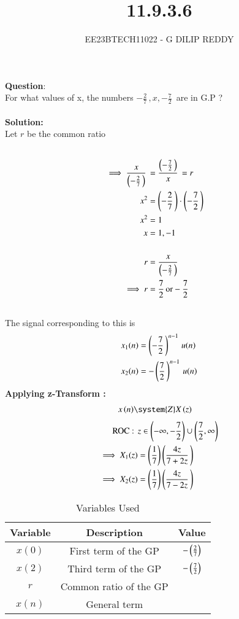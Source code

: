 \documentclass[journal,12pt,twocolumn]{IEEEtran}
\theoremstyle{remark}
\begin{document}

\vspace{3cm}

\title{11.9.3.6}
\author{EE23BTECH11022 - G DILIP REDDY}
\maketitle
\newpage

\bigskip

\renewcommand{\thefigure}{\theenumi}
\renewcommand{\thetable}{\theenumi}
\textbf{Question}:\\
For what values of x, the numbers $-\frac{2}{7}\,,x,-\frac{7}{2}\,$ are in G.P ?
\\\\
\textbf{Solution: }\\
Let $r$ be the common ratio
\begin{align}
\\\implies \frac{x}{\left(-\frac{2}{7}\,\right)}\,&= \frac{\left(-\frac{7}{2}\,\right)}{x}\,=r \\
x^2&=\left(-\frac{2}{7}\,\right)\cdot\left(-\frac{7}{2}\,\right)\\
x^2&=1\\
x&=1,-1\\\notag\\
r&=\frac{x}{\left(-\frac{2}{7}\,\right)}\\
\implies r&=\frac{7}{2}\,\text{or} -\frac{7}{2}\,\\\notag
\end{align}
The signal corresponding to this is 
\begin{align}
x_1(n)&=\left(-\frac{7}{2}\,\right)^{n-1}\,u(n)\,\\
x_2(n)&=-\left(\frac{7}{2}\,\right)^{n-1}\,u(n)
\end{align}
\textbf{Applying z-Transform :}
\begin{align}
	x \brak{n} & \system{Z} X \brak{z} \notag
\end{align}
\begin{align}
\text{ROC : }\,&z \in \left(-\infty,-\frac{7}{2}\right)\cup\left(\frac{7}{2},\infty\right)\notag\\
\implies X_1(z)&=\left(\frac{1}{7}\right)\left(\frac{4z}{7+2z}\,\right)\\
\implies X_2(z)&=\left(\frac{1}{7}\right)\left(\frac{4z}{7-2z}\,\right)
\end{align}
\begin{table}[h]
    \centering
    \renewcommand\thetable{1}
    \begin{tabular}[12.1pt]{ |c| c| c|}
    \hline
    \textbf{Variable} & \textbf{Description} &\textbf{Value}\\ 
    \hline
    $x(0)$ & First term of the GP &$-\left(\frac{2}{7}\right)$ \\
    \hline 
    $x(2)$ & Third term of the GP &$-\left(\frac{7}{2}\right)$ \\
    \hline 
    $r$ & Common ratio of the GP &  \\
    \hline
    $x(n)$ & General term & \\
    \hline    
    \end{tabular}
    \caption{Variables Used}
\end{table}
\end{document}
